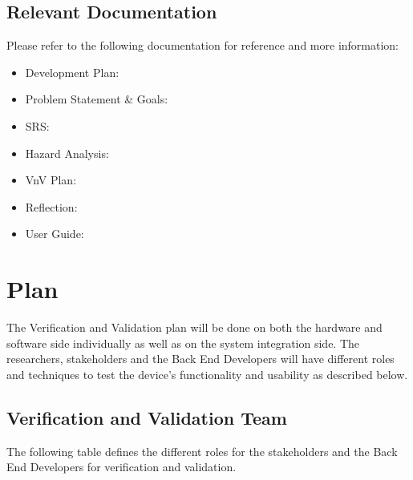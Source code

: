 \documentclass[12pt, titlepage]{article}
\begin{document}
\subsection{Relevant Documentation}

Please refer to the following documentation for reference and more information:

\begin{itemize}
  \item Development Plan: \citet{Development_Plan}
  \item Problem Statement \& Goals: \citet{Prob_n_Goals}
  \item SRS: \citet{SRS}
  \item Hazard Analysis: \citet{Hazard_Analysis}
  \item VnV Plan: \citet{VnV_Plan}
  \item Reflection: \citet{Reflection}
  \item User Guide: \citet{User_Guide}
\end{itemize}



\section{Plan}

The Verification and Validation plan will be done on both the hardware and software side individually as well as on the system integration side. The researchers, stakeholders and the Back End Developers will have different roles and techniques to test the device's functionality and usability as described below.

\pagebreak
\subsection{Verification and Validation Team}

The following table defines the different roles for the stakeholders and the Back End Developers for verification and validation.
\end{document}
